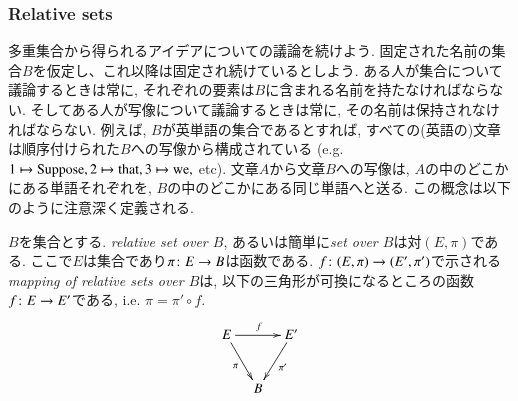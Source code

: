 \subsubsection{Relative sets}\label{sec:relative sets}


多重集合から得られるアイデアについての議論を続けよう. 固定された名前の集合$B$を仮定し、これ以降は固定され続けているとしよう. ある人が集合について議論するときは常に, それぞれの要素は$B$に含まれる名前を持たなければならない. そしてある人が写像について議論するときは常に, その名前は保持されなければならない. 例えば, $B$が英単語の集合であるとすれば, すべての(英語の)文章は順序付けられた$B$への写像から構成されている (e.g. $1\mapsto \tn{Suppose}, 2\mapsto\tn{that}, 3\mapsto\tn{we},$ etc). 文章$A$から文章$B$への写像は, $A$の中のどこかにある単語それぞれを, $B$の中のどこかにある同じ単語へと送る. この概念は以下のように注意深く定義される.

\begin{definition}\label{def:relative sets}


$B$を集合とする. \emph{relative set over $B$}, あるいは簡単に\emph{set over $B$}は対$(E,\pi)$である. ここで$E$は集合であり$\pi\colon E\rightarrow B$は函数である. $f\colon (E,\pi)\rightarrow(E',\pi')$で示される\emph{mapping of relative sets over $B$}は, 以下の三角形が可換になるところの函数$f\colon E\rightarrow E'$である, i.e. $\pi=\pi'\circ f$.
$$
\xymatrix@=10pt{E\ar[rr]^f\ar[rdd]_{\pi}&&E'\ar[ldd]^{\pi'}\\\\&B
}
$$

\end{definition}

